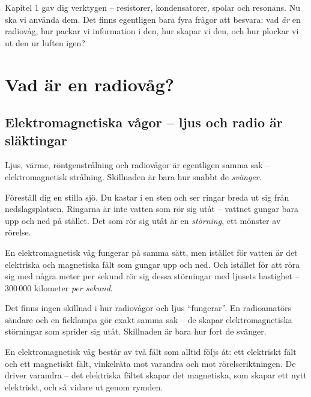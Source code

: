 \documentclass[a4paper,11pt,twoside]{book}
\newcommand{\emoji}[1]{{\emojifont #1}}
\begin{document}
Kapitel 1 gav dig verktygen -- resistorer, kondensatorer, spolar och resonans. Nu ska vi använda dem. Det finns egentligen bara fyra frågor att besvara: vad \emph{är} en radiovåg, hur packar vi information i den, hur skapar vi den, och hur plockar vi ut den ur luften igen?

\section{Vad är en radiovåg?}

\subsection{Elektromagnetiska vågor -- ljus och radio är släktingar}

Ljus, värme, röntgenstrålning och radiovågor är egentligen samma
sak -- elektromagnetisk strålning. Skillnaden är bara hur snabbt
de \emph{svänger}.

\begin{storybox}[{\emoji{🌊} Dammet och stenen}]
Föreställ dig en stilla sjö. Du kastar i en sten och ser ringar
breda ut sig från nedslagsplatsen. Ringarna är inte vatten som
rör sig utåt -- vattnet gungar bara upp och ned på stället.
Det som rör sig utåt är en \emph{störning}, ett mönster av rörelse.

En elektromagnetisk våg fungerar på samma sätt, men istället för
vatten är det elektriska och magnetiska fält som gungar upp och ned.
Och istället för att röra sig med några meter per sekund rör sig
dessa störningar med ljusets hastighet -- 300\,000 kilometer
\emph{per sekund}.

Det finns ingen skillnad i hur radiovågor och ljus ``fungerar''.
En radioamatörs sändare och en ficklampa gör exakt samma sak --
de skapar elektromagnetiska störningar som sprider sig utåt.
Skillnaden är bara hur fort de svänger.
\end{storybox}

En elektromagnetisk våg består av två fält som alltid följs åt:
ett elektriskt fält och ett magnetiskt fält, vinkelräta mot varandra
och mot rörelseriktningen. De driver varandra -- det elektriska
fältet skapar det magnetiska, som skapar ett nytt elektriskt, och
så vidare ut genom rymden.
\end{document}

